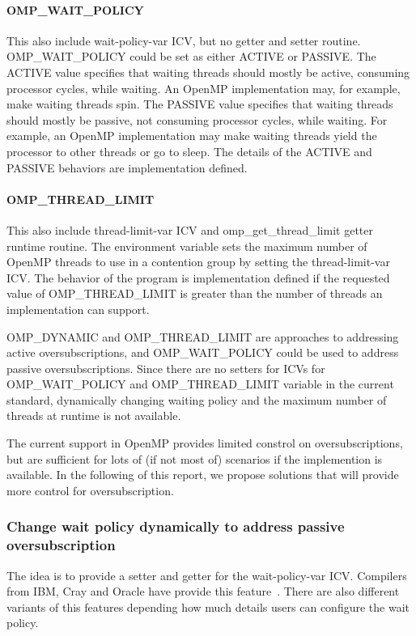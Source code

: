 \paragraph{OMP\_WAIT\_POLICY} %
This also include wait-policy-var ICV, but no getter and setter routine. 
OMP\_WAIT\_POLICY could be set as either ACTIVE or PASSIVE. 
The ACTIVE value specifies that waiting threads should mostly be active, consuming processor
 cycles, while waiting. An OpenMP implementation may, for example, make waiting threads spin.
 The PASSIVE value specifies that waiting threads should mostly be passive, not consuming
 processor cycles, while waiting. For example, an OpenMP implementation may make waiting
 threads yield the processor to other threads or go to sleep.
 The details of the ACTIVE and PASSIVE behaviors are implementation defined.
 
 \paragraph{OMP\_THREAD\_LIMIT}
 This also include thread-limit-var ICV and omp\_get\_thread\_limit getter runtime routine.
 The environment variable sets the maximum number of OpenMP threads to use in a contention group by setting the thread-limit-var ICV.
The behavior of the program is implementation defined if the requested value of OMP\_THREAD\_LIMIT is greater than the number of threads an implementation can support. 

OMP\_DYNAMIC and OMP\_THREAD\_LIMIT are approaches to 
addressing active oversubscriptions, and OMP\_WAIT\_POLICY could be used to address 
passive oversubscriptions. 
Since there are no setters for ICVs for OMP\_WAIT\_POLICY 
and OMP\_THREAD\_LIMIT variable in the current standard, 
dynamically changing waiting policy and the maximum number of 
threads at runtime is not available.

The current support in OpenMP provides limited constrol on oversubscriptions, but are sufficient 
for lots of (if not most of) scenarios if the implemention is available. In the following of this
report, we propose solutions that will provide more
control for oversubscription.
\subsubsection{Change wait policy dynamically to address passive oversubscription}
The idea is to provide a setter and getter for the wait-policy-var
ICV. Compilers from IBM, Cray and Oracle have provide this feature~\cite{ibmwait,craywait,oraclewait}.
There are also different variants of this features depending how much details users can configure
the wait policy.
